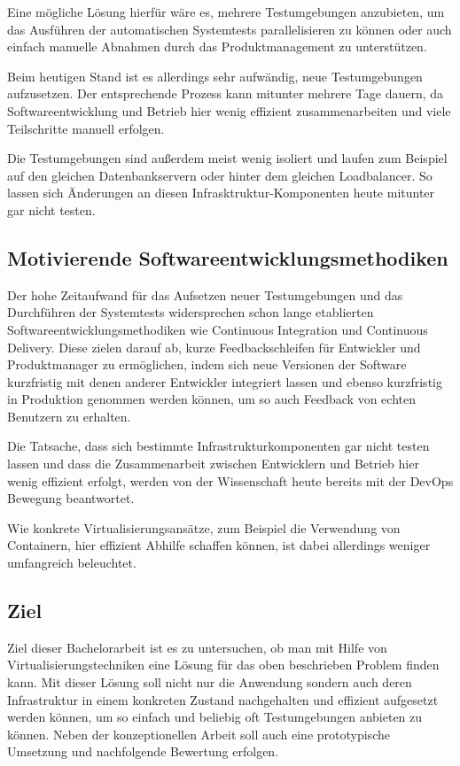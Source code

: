 Eine mögliche Lösung hierfür wäre es, mehrere Testumgebungen anzubieten, um das Ausführen der automatischen Systemtests parallelisieren zu können oder auch einfach manuelle Abnahmen durch das Produktmanagement zu unterstützen.

Beim heutigen Stand ist es allerdings sehr aufwändig, neue Testumgebungen aufzusetzen. Der entsprechende Prozess kann mitunter mehrere Tage dauern, da Softwareentwicklung und Betrieb hier wenig effizient zusammenarbeiten und viele Teilschritte manuell erfolgen.

Die Testumgebungen sind außerdem meist wenig isoliert und laufen zum Beispiel auf den gleichen Datenbankservern oder hinter dem gleichen Loadbalancer. So lassen sich Änderungen an diesen Infrasktruktur-Komponenten heute mitunter gar nicht testen.

\subsection{Motivierende Softwareentwicklungsmethodiken}

Der hohe Zeitaufwand für das Aufsetzen neuer Testumgebungen und das Durchführen der Systemtests widersprechen schon lange etablierten Softwareentwicklungsmethodiken wie Continuous Integration und Continuous Delivery. Diese zielen darauf ab, kurze Feedbackschleifen für Entwickler und Produktmanager zu ermöglichen, indem sich neue Versionen der Software kurzfristig mit denen anderer Entwickler integriert lassen und ebenso kurzfristig in Produktion genommen werden können, um so auch Feedback von echten Benutzern zu erhalten.

Die Tatsache, dass sich bestimmte Infrastrukturkomponenten gar nicht testen lassen und dass die Zusammenarbeit zwischen Entwicklern und Betrieb hier wenig effizient erfolgt, werden von der Wissenschaft heute bereits mit der DevOps Bewegung beantwortet.

Wie konkrete Virtualisierungsansätze, zum Beispiel die Verwendung von Containern, hier effizient Abhilfe schaffen können, ist dabei allerdings weniger umfangreich beleuchtet.

\subsection{Ziel}

Ziel dieser Bachelorarbeit ist es zu untersuchen, ob man mit Hilfe von Virtualisierungstechniken eine Lösung für das oben beschrieben Problem finden kann. Mit dieser Lösung soll nicht nur die Anwendung sondern auch deren Infrastruktur in einem konkreten Zustand nachgehalten und effizient aufgesetzt werden können, um so einfach und beliebig oft Testumgebungen anbieten zu können. Neben der konzeptionellen Arbeit soll auch eine prototypische Umsetzung und nachfolgende Bewertung erfolgen.

